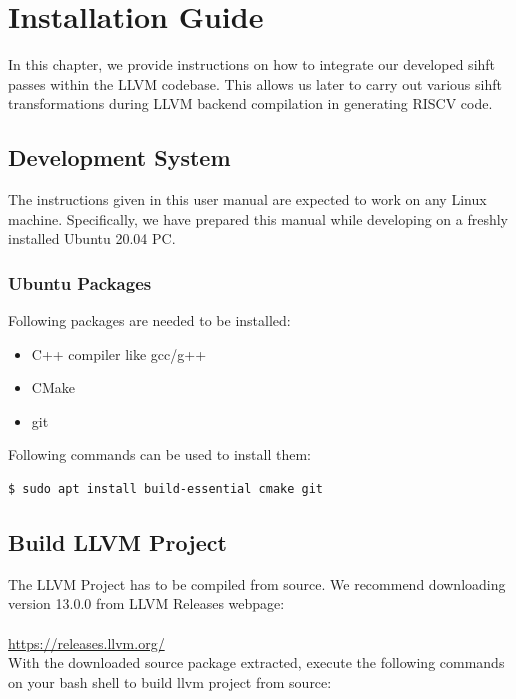 

\chapter{Installation Guide}
\label{ch:Install}

In this chapter, we provide instructions on how to integrate our developed \ac{sihft} passes within the LLVM codebase.
This allows us later to carry out various \ac{sihft} transformations during LLVM backend compilation in generating
RISCV code.

\section{Development System}
The instructions given in this user manual are expected to work on any Linux machine. Specifically, we have prepared
this manual while developing on a freshly installed Ubuntu 20.04 PC.

\subsection{Ubuntu Packages}
Following packages are needed to be installed:

\begin{itemize}
 \item{C++ compiler like gcc/g++}
 \item{CMake}
 \item{git}
\end{itemize}

Following commands can be used to install them:

\begin{lstlisting}[language=bash, frame=single, basicstyle=\small\ttfamily]
$ sudo apt install build-essential cmake git
  \end{lstlisting}

\section{Build LLVM Project}
\label{sec:build-llvm}
The LLVM Project has to be compiled from source. We recommend downloading version 13.0.0 from LLVM Releases webpage:
\\\\
\url{https://releases.llvm.org/} \\

With the downloaded source package extracted, execute the following commands on your bash shell to build
llvm project from source:

